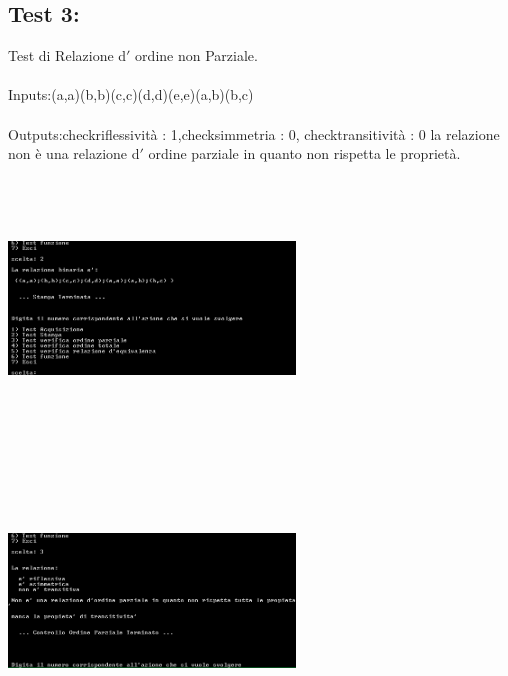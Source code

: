 \documentclass[11pt, a4paper, titlepage, block]{article}
\begin{document}
	\subsection{Test 3:} 
	Test di Relazione d$'$ ordine non Parziale.\\
	\\
	Inputs:(a,a)(b,b)(c,c)(d,d)(e,e)(a,b)(b,c)\\
	\\
	Outputs:checkriflessivit\`a : 1,checksimmetria : 0, checktransitivit\`a : 0
	la relazione non \`e una relazione d$'$ ordine parziale in quanto non rispetta le propriet\`a.\\
	\includegraphics[width=3in,height=3in,viewport=0 0 300 300]{../Screenshots/Test3Input.png}
	\\
	\includegraphics[width=3in,height=3in,viewport=0 0 300 300]{../Screenshots/Test3Output.png}
	\\
	\\
	\newpage
\end{document}
